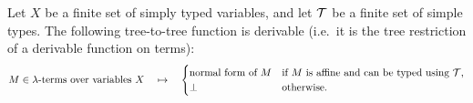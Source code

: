 \begin{theorem}\label{thm:normalise} Let $X$ be a finite set of simply typed variables, and let $\mathcal T$ be a finite set of simple types.
    The following tree-to-tree function is derivable (i.e.~it is the tree restriction of a derivable function on terms):
    \begin{align*}
        M \in \text{$\lambda$-terms over variables $X$} \quad \mapsto \quad \begin{cases}
            \text{normal form of $M$} & \text{if $M$ is affine and can be typed using ${\mathcal T}$,}\\
            \bot & \text{otherwise}.
        \end{cases}
    \end{align*}
\end{theorem}






